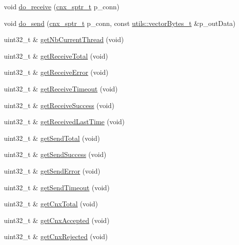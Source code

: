 \begin{DoxyCompactItemize}
\item 
void \hyperlink{classxtd_1_1network_1_1base_1_1Server_a5852cbdc5fa348c25797962a69d6b115}{do\-\_\-receive} (\hyperlink{classxtd_1_1network_1_1base_1_1Server_aea8c26b2edf1f6c8802db01b3c6b6036}{cnx\-\_\-sptr\-\_\-t} p\-\_\-conn)
\item 
void \hyperlink{classxtd_1_1network_1_1base_1_1Server_aa633c11edb82dcfc0b3804f4d57cdc5c}{do\-\_\-send} (\hyperlink{classxtd_1_1network_1_1base_1_1Server_aea8c26b2edf1f6c8802db01b3c6b6036}{cnx\-\_\-sptr\-\_\-t} p\-\_\-conn, const \hyperlink{namespacextd_1_1network_1_1utils_a9fedf0d18549b8034e9ae347955e9a9a}{utils\-::vector\-Bytes\-\_\-t} \&p\-\_\-out\-Data)
\item 
uint32\-\_\-t \& \hyperlink{classxtd_1_1network_1_1base_1_1Server_afdbfe06eac7640eed92c86ea38c089d2}{get\-Nb\-Current\-Thread} (void)
\item 
uint32\-\_\-t \& \hyperlink{classxtd_1_1network_1_1base_1_1Server_a2f1c82fa4d94a0868ab1a9b957b0e1ed}{get\-Receive\-Total} (void)
\item 
uint32\-\_\-t \& \hyperlink{classxtd_1_1network_1_1base_1_1Server_a798d800b0cda41fb3d6bc9be0cb07036}{get\-Receive\-Error} (void)
\item 
uint32\-\_\-t \& \hyperlink{classxtd_1_1network_1_1base_1_1Server_a897bb823741706c6f3f91aef601ab3d9}{get\-Receive\-Timeout} (void)
\item 
uint32\-\_\-t \& \hyperlink{classxtd_1_1network_1_1base_1_1Server_ae2e9b2858e9a7f142f98fcc4299b2a4a}{get\-Receive\-Success} (void)
\item 
uint32\-\_\-t \& \hyperlink{classxtd_1_1network_1_1base_1_1Server_a48e49f13ebcc958cb05737af08c761fc}{get\-Received\-Last\-Time} (void)
\item 
uint32\-\_\-t \& \hyperlink{classxtd_1_1network_1_1base_1_1Server_a4b5d9bb1401c63af63598ab987dc1ea1}{get\-Send\-Total} (void)
\item 
uint32\-\_\-t \& \hyperlink{classxtd_1_1network_1_1base_1_1Server_ad225f1e73ec0fc1ba2a54e3363881aa4}{get\-Send\-Success} (void)
\item 
uint32\-\_\-t \& \hyperlink{classxtd_1_1network_1_1base_1_1Server_adeb8afa131ea136a61297f6d6e7af96a}{get\-Send\-Error} (void)
\item 
uint32\-\_\-t \& \hyperlink{classxtd_1_1network_1_1base_1_1Server_af7fb5d4acd247d070d7330686d2d0717}{get\-Send\-Timeout} (void)
\item 
uint32\-\_\-t \& \hyperlink{classxtd_1_1network_1_1base_1_1Server_aaed2e2436b27ebb7609c66e1002a8c56}{get\-Cnx\-Total} (void)
\item 
uint32\-\_\-t \& \hyperlink{classxtd_1_1network_1_1base_1_1Server_a3025e5dd8f30f36ebe52568d5c45966b}{get\-Cnx\-Accepted} (void)
\item 
uint32\-\_\-t \& \hyperlink{classxtd_1_1network_1_1base_1_1Server_a07a3891c57d59f642d491e1d30e3eaa1}{get\-Cnx\-Rejected} (void)
\end{DoxyCompactItemize}
